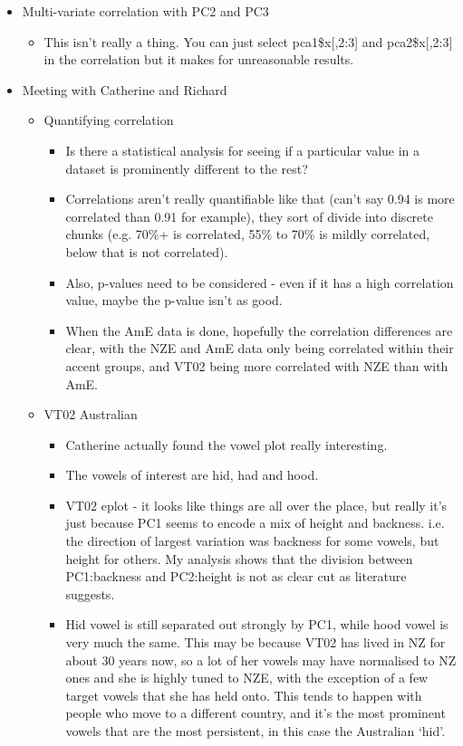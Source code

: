 \documentclass{article}
\begin{document}
\begin{itemize}
\begin{itemize}
    \end{itemize}
    \item Multi-variate correlation with PC2 and PC3
    \begin{itemize}
        \item This isn't really a thing. You can just select pca1\$x[,2:3] and pca2\$x[,2:3] in the correlation but it makes for unreasonable results.
    \end{itemize}
    \item Meeting with Catherine and Richard
    \begin{itemize}
        \item Quantifying correlation
        \begin{itemize}
            \item Is there a statistical analysis for seeing if a particular value in a dataset is prominently different to the rest?
            \item Correlations aren't really quantifiable like that (can't say 0.94 is more correlated than 0.91 for example), they sort of divide into discrete chunks (e.g. 70\%+ is correlated, 55\% to 70\% is mildly correlated, below that is not correlated).
            \item Also, p-values need to be considered - even if it has a high correlation value, maybe the p-value isn't as good.
            \item When the AmE data is done, hopefully the correlation differences are clear, with the NZE and AmE data only being correlated within their accent groups, and VT02 being more correlated with NZE than with AmE.
        \end{itemize}
        \item VT02 Australian 
        \begin{itemize}
            \item Catherine actually found the vowel plot really interesting.
            \item The vowels of interest are hid, had and hood.
            \item VT02 eplot - it looks like things are all over the place, but really it's just because PC1 seems to encode a mix of height and backness. i.e. the direction of largest variation was backness for some vowels, but height for others. My analysis shows that the division between PC1:backness and PC2:height is not as clear cut as literature suggests.
            \item Hid vowel is still separated out strongly by PC1, while hood vowel is very much the same. This may be because VT02 has lived in NZ for about 30 years now, so a lot of her vowels may have normalised to NZ ones and she is highly tuned to NZE, with the exception of a few target vowels that she has held onto. This tends to happen with people who move to a different country, and it's the most prominent vowels that are the most persistent, in this case the Australian `hid'.

\end{itemize}
\end{itemize}
\end{itemize}
\end{document}
